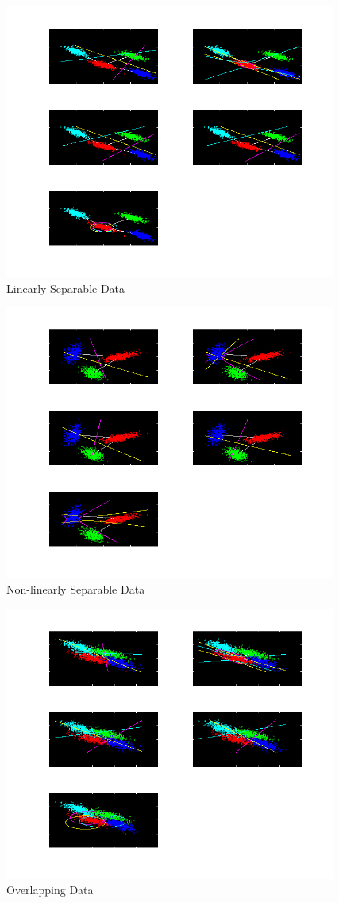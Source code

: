 \documentclass[11pt,a4paper]{article}
\begin{document}
\begin{figure}[H]
	\includegraphics[height=9cm]{Figures/LS_DB.png}
	\caption{Linearly Separable Data}
\end{figure}

\begin{figure}[H]
	\includegraphics[height=9cm]{Figures/NLS_DB.png}
	\caption{Non-linearly Separable Data}
\end{figure}

\begin{figure}[H]
	\includegraphics[height=9cm]{Figures/OD_DB.png}
	\caption{Overlapping Data}
\end{figure}
\end{document}
